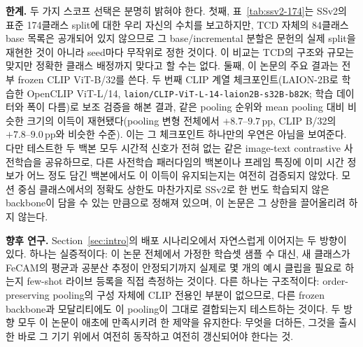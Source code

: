 \documentclass[11pt]{article}
\begin{document}
\textbf{한계.} 두 가지 스코프 선택은 분명히 밝혀야 한다. 첫째,
표~\ref{tab:ssv2-174}는 SSv2의 표준 174클래스 split에 대한 우리 자신의
수치를 보고하지만, TCD 자체의 84클래스 base 목록은 공개되어 있지
않으므로 그 base/incremental 분할은 문헌의 실제 split을 재현한 것이
아니라 seed마다 무작위로 정한 것이다. 이 비교는 TCD의 구조와 규모는
맞지만 정확한 클래스 배정까지 맞다고 할 수는 없다. 둘째, 이 논문의
주요 결과는 전부 frozen CLIP ViT-B/32를 쓴다. 두 번째 CLIP 계열
체크포인트(LAION-2B로 학습한 OpenCLIP ViT-L/14,
\texttt{laion/CLIP-ViT-L-14-laion2B-s32B-b82K}; 학습 데이터와 폭이 다름)로 보조 검증을
해본 결과, 같은 pooling 순위와 mean pooling 대비 비슷한 크기의 이득이
재현됐다(pooling 변형 전체에서 $+8.7$--$9.7$\,pp, CLIP B/32의
$+7.8$--$9.0$\,pp와 비슷한 수준). 이는 그 체크포인트 하나만의
우연은 아님을 보여준다. 다만 테스트한 두 백본 모두 시간적 신호가
전혀 없는 같은 image-text contrastive 사전학습을 공유하므로, 다른
사전학습 패러다임의 백본이나 프레임 특징에 이미 시간 정보가 어느
정도 담긴 백본에서도 이 이득이 유지되는지는 여전히 검증되지 않았다.
모션 중심 클래스에서의 정확도 상한도 마찬가지로 SSv2로 한 번도
학습되지 않은 backbone이 담을 수 있는 만큼으로 정해져 있으며, 이
논문은 그 상한을 끌어올리려 하지 않는다.

\textbf{향후 연구.} Section~\ref{sec:intro}의 배포 시나리오에서 자연스럽게
이어지는 두 방향이 있다. 하나는 실증적이다: 이 논문 전체에서 가정한 학습셋 샘플 수 대신,
새 클래스가 FeCAM의 평균과 공분산 추정이 안정되기까지 실제로 몇 개의
예시 클립을 필요로 하는지 few-shot 라이브 등록을 직접 측정하는
것이다. 다른 하나는 구조적이다: order-preserving pooling의 구성
자체에 CLIP 전용인 부분이 없으므로, 다른 frozen backbone과
모달리티에도 이 pooling이 그대로 결합되는지 테스트하는 것이다. 두
방향 모두 이 논문이 애초에 만족시키려 한 제약을 유지한다: 무엇을
더하든, 그것을 출시한 바로 그 기기 위에서 여전히 동작하고 여전히
갱신되어야 한다는 것.
\end{document}
